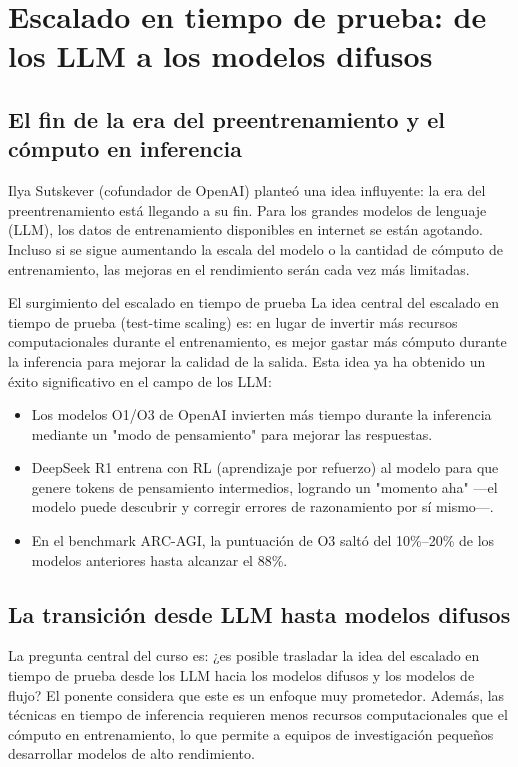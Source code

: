 \section{Escalado en tiempo de prueba: de los LLM a los modelos difusos}

\subsection{El fin de la era del preentrenamiento y el cómputo en inferencia}

Ilya Sutskever (cofundador de OpenAI) planteó una idea influyente: la era del preentrenamiento está llegando a su fin. Para los grandes modelos de lenguaje (LLM), los datos de entrenamiento disponibles en internet se están agotando. Incluso si se sigue aumentando la escala del modelo o la cantidad de cómputo de entrenamiento, las mejoras en el rendimiento serán cada vez más limitadas.

\begin{knowledgebox}{El surgimiento del escalado en tiempo de prueba}
La idea central del escalado en tiempo de prueba (test-time scaling) es: en lugar de invertir más recursos computacionales durante el entrenamiento, es mejor gastar más cómputo durante la inferencia para mejorar la calidad de la salida. Esta idea ya ha obtenido un éxito significativo en el campo de los LLM:
\begin{itemize}
    \item Los modelos O1/O3 de OpenAI invierten más tiempo durante la inferencia mediante un "modo de pensamiento" para mejorar las respuestas.
    \item DeepSeek R1 entrena con RL (aprendizaje por refuerzo) al modelo para que genere tokens de pensamiento intermedios, logrando un "momento aha" —el modelo puede descubrir y corregir errores de razonamiento por sí mismo—.
    \item En el benchmark ARC-AGI, la puntuación de O3 saltó del 10\%--20\% de los modelos anteriores hasta alcanzar el 88\%.
\end{itemize}
\end{knowledgebox}

\subsection{La transición desde LLM hasta modelos difusos}

La pregunta central del curso es: ¿es posible trasladar la idea del escalado en tiempo de prueba desde los LLM hacia los modelos difusos y los modelos de flujo? El ponente considera que este es un enfoque muy prometedor. Además, las técnicas en tiempo de inferencia requieren menos recursos computacionales que el cómputo en entrenamiento, lo que permite a equipos de investigación pequeños desarrollar modelos de alto rendimiento.

